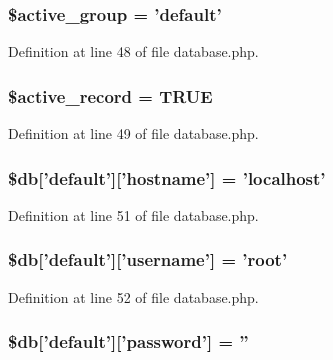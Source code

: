 \subsubsection[{\$active\-\_\-group}]{\setlength{\rightskip}{0pt plus 5cm}\$active\-\_\-group = 'default'}\label{production_2database_8php_a5046ea83a698c5b7bbf6ffd3dd816b65}


Definition at line 48 of file database.\-php.

\subsubsection[{\$active\-\_\-record}]{\setlength{\rightskip}{0pt plus 5cm}\$active\-\_\-record = T\-R\-U\-E}\label{production_2database_8php_a228b6ea91602f48a8831d0dc94809b94}


Definition at line 49 of file database.\-php.

\subsubsection[{\$db}]{\setlength{\rightskip}{0pt plus 5cm}\$db['default']['hostname'] = 'localhost'}\label{production_2database_8php_a987b8cb0ae83b9519cb7c36fe25dbdd8}


Definition at line 51 of file database.\-php.

\subsubsection[{\$db}]{\setlength{\rightskip}{0pt plus 5cm}\$db['default']['username'] = 'root'}\label{production_2database_8php_a2f535f16fa00521992cfc791c8dcec37}


Definition at line 52 of file database.\-php.

\subsubsection[{\$db}]{\setlength{\rightskip}{0pt plus 5cm}\$db['default']['password'] = ''}\label{production_2database_8php_a1f6afce218438d9f7d13e28ee602e29b}


